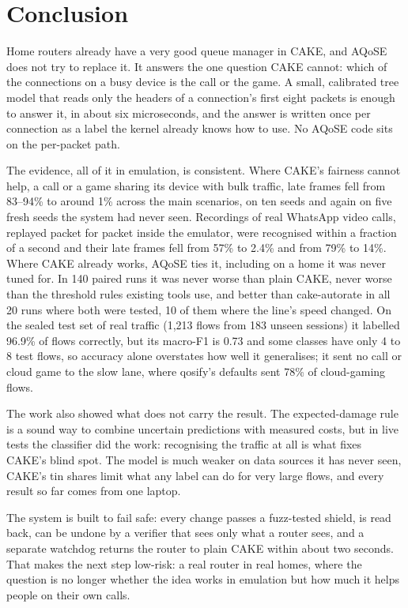 \documentclass[11pt,a4paper]{article}
\begin{document}
\section{Conclusion}
Home routers already have a very good queue manager in CAKE, and AQoSE does not try to replace it. It answers the one question CAKE cannot: which of the connections on a busy device is the call or the game. A small, calibrated tree model that reads only the headers of a connection's first eight packets is enough to answer it, in about six microseconds, and the answer is written once per connection as a label the kernel already knows how to use. No AQoSE code sits on the per-packet path.

The evidence, all of it in emulation, is consistent. Where CAKE's fairness cannot help, a call or a game sharing its device with bulk traffic, late frames fell from 83--94\% to around 1\% across the main scenarios, on ten seeds and again on five fresh seeds the system had never seen. Recordings of real WhatsApp video calls, replayed packet for packet inside the emulator, were recognised within a fraction of a second and their late frames fell from 57\% to 2.4\% and from 79\% to 14\%. Where CAKE already works, AQoSE ties it, including on a home it was never tuned for. In 140 paired runs it was never worse than plain CAKE, never worse than the threshold rules existing tools use, and better than cake-autorate in all 20 runs where both were tested, 10 of them where the line's speed changed. On the sealed test set of real traffic (1,213 flows from 183 unseen sessions) it labelled 96.9\% of flows correctly, but its macro-F1 is 0.73 and some classes have only 4 to 8 test flows, so accuracy alone overstates how well it generalises; it sent no call or cloud game to the slow lane, where qosify's defaults sent 78\% of cloud-gaming flows.

The work also showed what does not carry the result. The expected-damage rule is a sound way to combine uncertain predictions with measured costs, but in live tests the classifier did the work: recognising the traffic at all is what fixes CAKE's blind spot. The model is much weaker on data sources it has never seen, CAKE's tin shares limit what any label can do for very large flows, and every result so far comes from one laptop.

The system is built to fail safe: every change passes a fuzz-tested shield, is read back, can be undone by a verifier that sees only what a router sees, and a separate watchdog returns the router to plain CAKE within about two seconds. That makes the next step low-risk: a real router in real homes, where the question is no longer whether the idea works in emulation but how much it helps people on their own calls.
\end{document}
